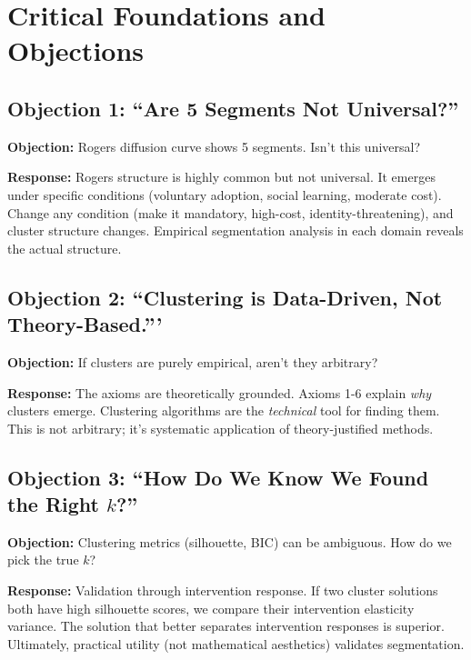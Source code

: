 \section{Critical Foundations and Objections}
\label{sec:ba-objections}

\subsection{Objection 1: ``Are 5 Segments Not Universal?''}

\textbf{Objection:} Rogers diffusion curve shows 5 segments. Isn't this universal?

\textbf{Response:} Rogers structure is highly common but not universal. It emerges
under specific conditions (voluntary adoption, social learning, moderate cost).
Change any condition (make it mandatory, high-cost, identity-threatening), and
cluster structure changes. Empirical segmentation analysis in each domain reveals
the actual structure.

\subsection{Objection 2: ``Clustering is Data-Driven, Not Theory-Based.'''}

\textbf{Objection:} If clusters are purely empirical, aren't they arbitrary?

\textbf{Response:} The axioms are theoretically grounded. Axioms 1-6 explain
\textit{why} clusters emerge. Clustering algorithms are the \textit{technical}
tool for finding them. This is not arbitrary; it's systematic application of
theory-justified methods.

\subsection{Objection 3: ``How Do We Know We Found the Right $k$?''}

\textbf{Objection:} Clustering metrics (silhouette, BIC) can be ambiguous. How
do we pick the true $k$?

\textbf{Response:} Validation through intervention response. If two cluster
solutions both have high silhouette scores, we compare their intervention
elasticity variance. The solution that better separates intervention responses
is superior. Ultimately, practical utility (not mathematical aesthetics) validates
segmentation.

